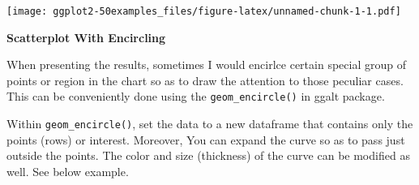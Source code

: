 \documentclass[a4paper]{article}
\newenvironment{Shaded}{\begin{snugshade}}{\end{snugshade}}
\newcommand{\KeywordTok}[1]{\textcolor[rgb]{0.13,0.29,0.53}{\textbf{#1}}}
\newcommand{\DataTypeTok}[1]{\textcolor[rgb]{0.13,0.29,0.53}{#1}}
\newcommand{\DecValTok}[1]{\textcolor[rgb]{0.00,0.00,0.81}{#1}}
\newcommand{\FloatTok}[1]{\textcolor[rgb]{0.00,0.00,0.81}{#1}}
\newcommand{\StringTok}[1]{\textcolor[rgb]{0.31,0.60,0.02}{#1}}
\newcommand{\CommentTok}[1]{\textcolor[rgb]{0.56,0.35,0.01}{\textit{#1}}}
\newcommand{\OperatorTok}[1]{\textcolor[rgb]{0.81,0.36,0.00}{\textbf{#1}}}
\newcommand{\NormalTok}[1]{#1}
\begin{document}
\texttt{[image: ggplot2-50examples\_files/figure-latex/unnamed-chunk-1-1.pdf]}
\newpage

\textbf{Scatterplot With Encircling}

When presenting the results, sometimes I would encirlce certain special
group of points or region in the chart so as to draw the attention to
those peculiar cases. This can be conveniently done using the
\texttt{geom\_encircle()} in ggalt package.

Within \texttt{geom\_encircle()}, set the data to a new dataframe that
contains only the points (rows) or interest. Moreover, You can expand
the curve so as to pass just outside the points. The color and size
(thickness) of the curve can be modified as well. See below example.

\begin{Shaded}
\end{Shaded}
\end{document}

